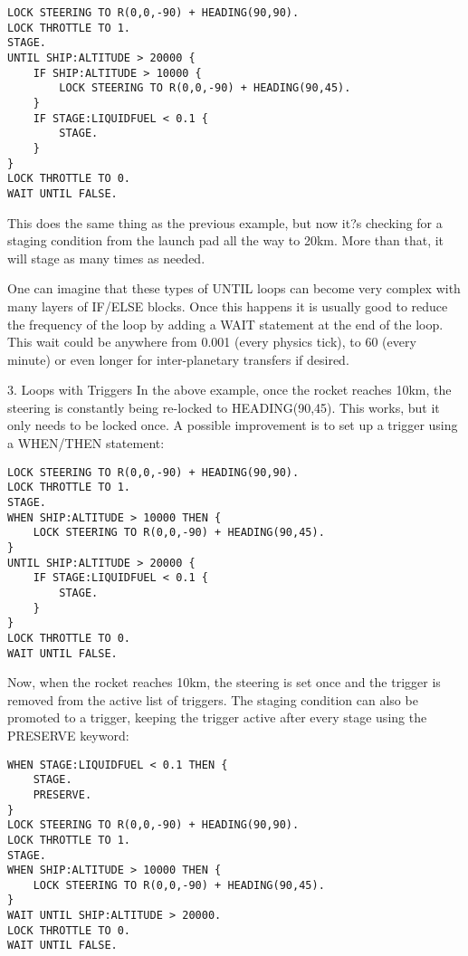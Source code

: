 \begin{Verbatim}[frame=single]
LOCK STEERING TO R(0,0,-90) + HEADING(90,90).
LOCK THROTTLE TO 1.
STAGE.
UNTIL SHIP:ALTITUDE > 20000 {
    IF SHIP:ALTITUDE > 10000 {
        LOCK STEERING TO R(0,0,-90) + HEADING(90,45).
    }
    IF STAGE:LIQUIDFUEL < 0.1 {
        STAGE.
    }
}
LOCK THROTTLE TO 0.
WAIT UNTIL FALSE.
\end{Verbatim} 

This does the same thing as the previous example, but now it?s checking for a staging condition from the launch pad all the way to 20km. More than that, it will stage as many times as needed.

One can imagine that these types of UNTIL loops can become very complex with many layers of IF/ELSE blocks. Once this happens it is usually good to reduce the frequency of the loop by adding a WAIT statement at the end of the loop. This wait could be anywhere from 0.001 (every physics tick), to 60 (every minute) or even longer for inter-planetary transfers if desired.

3. Loops with Triggers
In the above example, once the rocket reaches 10km, the steering is constantly being re-locked to HEADING(90,45). This works, but it only needs to be locked once. A possible improvement is to set up a trigger using a WHEN/THEN statement:

\begin{Verbatim}[frame=single]
LOCK STEERING TO R(0,0,-90) + HEADING(90,90).
LOCK THROTTLE TO 1.
STAGE.
WHEN SHIP:ALTITUDE > 10000 THEN {
    LOCK STEERING TO R(0,0,-90) + HEADING(90,45).
}
UNTIL SHIP:ALTITUDE > 20000 {
    IF STAGE:LIQUIDFUEL < 0.1 {
        STAGE.
    }
}
LOCK THROTTLE TO 0.
WAIT UNTIL FALSE.
\end{Verbatim} 

Now, when the rocket reaches 10km, the steering is set once and the trigger is removed from the active list of triggers. The staging condition can also be promoted to a trigger, keeping the trigger active after every stage using the PRESERVE keyword:

\begin{Verbatim}[frame=single]
WHEN STAGE:LIQUIDFUEL < 0.1 THEN {
    STAGE.
    PRESERVE.
}
LOCK STEERING TO R(0,0,-90) + HEADING(90,90).
LOCK THROTTLE TO 1.
STAGE.
WHEN SHIP:ALTITUDE > 10000 THEN {
    LOCK STEERING TO R(0,0,-90) + HEADING(90,45).
}
WAIT UNTIL SHIP:ALTITUDE > 20000.
LOCK THROTTLE TO 0.
WAIT UNTIL FALSE.
\end{Verbatim} 

